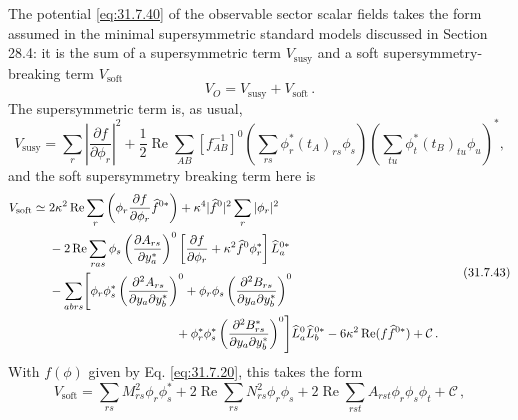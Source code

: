 The potential \eqref{eq:31.7.40} of the observable sector scalar fields
takes the form assumed in the minimal supersymmetric standard models
discussed in Section 28.4: it is the sum of a supersymmetric term
\(V_{\mathrm{susy}}\) and a soft supersymmetry-breaking term
\(V_{\mathrm{soft}}\)
\begin{equation}
  V_O=V_{\mathrm{susy}}+V_{\mathrm{soft}}\,.
  \tag{31.7.41}\label{eq:31.7.41}
\end{equation}
The supersymmetric term is, as usual,
\begin{equation}
  V_{\mathrm{susy}}
  =\sum_r\left|\frac{\partial f}{\partial\phi_r}\right|^2
  +\frac12\operatorname{Re}\sum_{AB}[f_{AB}^{-1}]^0
  \left(\sum_{rs}\phi_r^*(t_A)_{rs}\phi_s\right)
  \left(\sum_{tu}\phi_t^*(t_B)_{tu}\phi_u\right)^*,
  \tag{31.7.42}\label{eq:31.7.42}
\end{equation}
and the soft supersymmetry breaking term here is
\begin{equation}
  \begin{aligned}
  V_{\mathrm{soft}}\simeq{}&
  2\kappa^2\operatorname{Re}\sum_r
    \left(\phi_r\frac{\partial f}{\partial\phi_r}
      \widehat f^{0*}\right)
  +\kappa^4|\widehat f^0|^2\sum_r|\phi_r|^2
  \\
  &-2\operatorname{Re}\sum_{ras}\phi_s
  \left(\frac{\partial A_{rs}}{\partial y_a^*}\right)^0
  \left[
    \frac{\partial f}{\partial\phi_r}
    +\kappa^2\widehat f^0\phi_r^*
  \right]\widehat L_a^{0*}
  \\
  &-\sum_{abrs}\Biggl[
    \phi_r\phi_s^*
    \left(\frac{\partial^2A_{rs}}
      {\partial y_a\partial y_b^*}\right)^0
  +\phi_r\phi_s
    \left(\frac{\partial^2B_{rs}}
      {\partial y_a\partial y_b^*}\right)^0
  \\
  &\hspace{36mm}
  +\phi_r^*\phi_s^*
    \left(\frac{\partial^2B_{rs}^*}
      {\partial y_a\partial y_b^*}\right)^0
  \Biggr]\widehat L_a^0\widehat L_b^{0*}
  -6\kappa^2\operatorname{Re}(f\widehat f^{0*})
  +\mathcal C\,.
  \end{aligned}
  \tag{31.7.43}\label{eq:31.7.43}
\end{equation}
With \(f(\phi)\) given by Eq. \eqref{eq:31.7.20}, this takes the form
\begin{equation}
  V_{\mathrm{soft}}
  =\sum_{rs}M_{rs}^2\phi_r\phi_s^*
  +2\operatorname{Re}\sum_{rs}N_{rs}^2\phi_r\phi_s
  +2\operatorname{Re}\sum_{rst}A_{rst}\phi_r\phi_s\phi_t
  +\mathcal C\,,
  \tag{31.7.44}\label{eq:31.7.44}
\end{equation}
